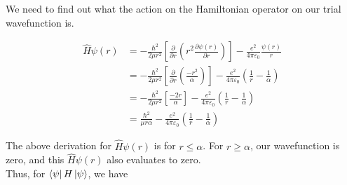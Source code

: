     We need to find out what the action on the Hamiltonian operator on our trial
    wavefunction is.

    \begin{equation*}
    \begin{split}
        \hat{H}\psi(r) & = -\frac{\hbar^2}{2\mu    r^2} \left[\frac{\partial}{\partial r}\left(r^2\frac{\partial\psi(r)}{\partial r}\right)\right] - \frac{e^2}{4\pi\varepsilon_0}\frac{\psi(r)}{r} \\
        & = -\frac{\hbar^2}{2\mu   r^2} \left[\frac{\partial}{\partial r}\left(\frac{-r^{2}}{\alpha}\right)\right] - \frac{e^2}{4\pi\varepsilon_0}\left(\frac{1}{r} - \frac{1}{\alpha}\right) \\
        & = -\frac{\hbar^2}{2\mu   r^2} \left[ \frac{-2r}{\alpha}\right] - \frac{e^2}{4\pi\varepsilon_0}\left(\frac{1}{r} - \frac{1}{\alpha}\right) \\
        & = \frac{\hbar^2}{\mu r\alpha} - \frac{e^2}{4\pi\varepsilon_0}\left(\frac{1}{r} - \frac{1}{\alpha}\right)
    \end{split}
    \end{equation*}

    The above derivation for $\hat{H}\psi(r)$ is for $r \leqslant \alpha$. For
    $r \geqslant \alpha$, our wavefunction is zero, and this $\hat{H}\psi(r)$
    also evaluates to zero.\\
    Thus, for $\bra{\psi}H\ket{\psi}$, we have

